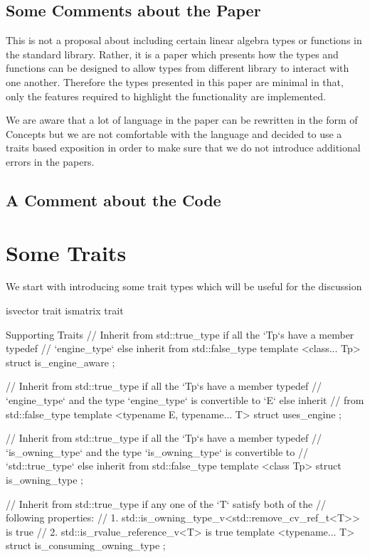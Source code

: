 \documentclass[oneside,11pt,a4paper]{jbarticle}
\begin{document}
\subsection{Some Comments about the Paper}
This is not a proposal about including certain linear algebra types or functions
in the standard library. Rather, it is a paper which presents how the types and
functions can be designed to allow types from different library to interact
with one another. Therefore the types presented in this paper are minimal in
that, only the features required to highlight the functionality are implemented.

We are aware that a lot of language in the paper can be rewritten in the
form of Concepts but we are not comfortable with the language and decided to use
a traits based exposition in order to make sure that we do not introduce
additional errors in the papers.

\subsection{A Comment about the Code}

\section{Some Traits}
We start with introducing some trait types which will be useful for the
discussion

isvector trait
ismatrix trait

\begin{codecpp}{Supporting Traits}
// Inherit from std::true_type if all the `Tp`s have a member typedef
// `engine_type` else inherit from std::false_type
template <class... Tp>
struct is_engine_aware {
};

// Inherit from std::true_type if all the `Tp`s have a member typedef
// `engine_type` and the type `engine_type` is convertible to `E` else inherit
// from std::false_type
template <typename E, typename... T>
struct uses_engine {
};


// Inherit from std::true_type if all the `Tp`s have a member typedef
// `is_owning_type` and the type `is_owning_type` is convertible to
// `std::true_type` else inherit from std::false_type
template <class Tp>
struct is_owning_type {
};

// Inherit from std::true_type if any one of the `T` satisfy both of the
// following properties:
// 1. std::is_owning_type_v<std::remove_cv_ref_t<T>> is true
// 2. std::is_rvalue_reference_v<T> is true
template <typename... T>
struct is_consuming_owning_type {
};
\end{codecpp}
\end{document}
